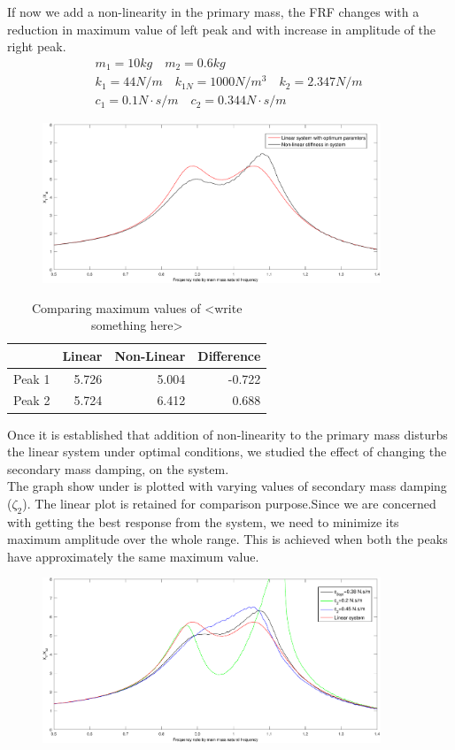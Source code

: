 If now we add a non-linearity in the primary mass,
the FRF changes with a reduction in maximum value of left peak and with increase in amplitude of the right peak.
\begin{align}
&m_1 = 10kg\quad m_2 = 0.6kg\quad \\
&k_1=44 N/m\quad
k_{1N} = 1000 N/m^3\quad k_2 = 2.347 N/m \quad \\
&c_1 = 0.1 N\cdot s/m \quad
c_2 = 0.344 N\cdot s/m 
\end{align}
\begin{figure}[h!]
\includegraphics[width=0.9\textwidth]{"figures/nonlinear"}
\end{figure}
\begin{table}
\centering
\begin{tabular}{|r|r|r|r|}
\hline
 & Linear & Non-Linear & Difference \\ \hline
Peak 1 & 5.726 & 5.004 & -0.722\\
Peak 2 & 5.724  & 6.412 & 0.688\\ \hline
\end{tabular}
\caption{Comparing maximum values of <write something here> }
\end{table}
Once it is established that addition of non-linearity to the primary mass disturbs the linear system under optimal conditions, we studied the effect of changing the secondary mass damping, on the system.\\
The graph show under is plotted with varying values of secondary mass damping ($\zeta_2$). The linear plot is retained for comparison purpose.Since we are concerned with getting the best response from the system, we need to minimize its maximum amplitude over the whole range. This is achieved when both the peaks have approximately the same maximum value.\\[0.2in]
\begin{figure}[h!]
\includegraphics[width=0.9\textwidth]{"figures/change"}\\[0.2in] 
\end{figure}
